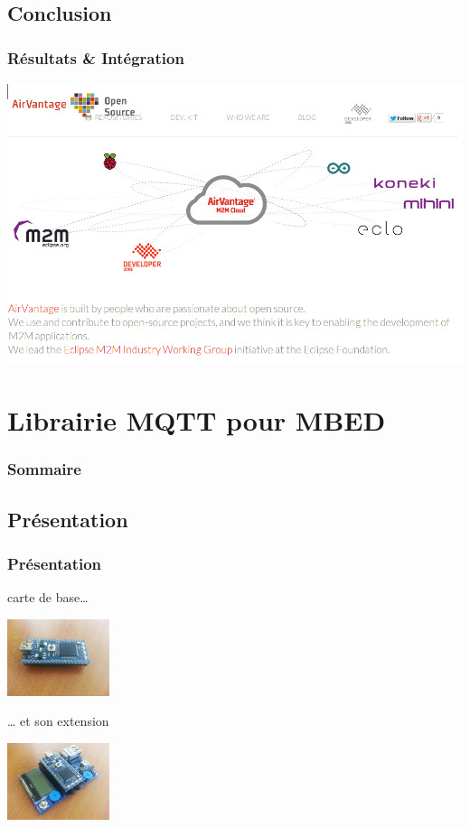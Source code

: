 \documentclass[slidetop,11pt]{beamer}
\begin{document}
\subsection{Conclusion}
\begin{frame}
    \frametitle{Résultats \& Intégration}
    \includegraphics[width=\linewidth]{img/avgio.png}
\end{frame}

\section{Librairie MQTT pour MBED}

\begin{frame}
    \frametitle{Sommaire}
\end{frame}

\subsection{Présentation}
\begin{frame}
    \frametitle{Présentation}
    \begin{block}{carte de base…}
        \begin{center}
            \includegraphics[width=3cm]{img/mbed.jpg}
        \end{center}
    \end{block}
    \begin{block}{… et son extension}
        \begin{center}
            \includegraphics[width=3cm]{img/mbed_ext.jpg}
        \end{center}
    \end{block}
\end{frame}
\end{document}

